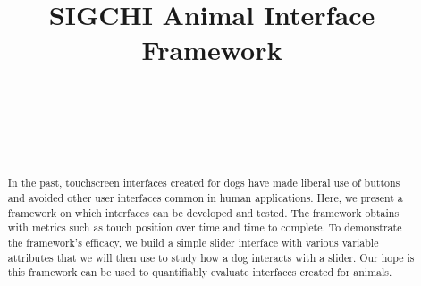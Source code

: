 \documentclass{sigchi}
\def\plaintitle{SIGCHI Animal Interface Framework}
\begin{document}
    \title{\plaintitle}

    \author{%
    \\
    \\
    \\
    \\
    }

    \maketitle

    \begin{abstract}
        In the past, touchscreen interfaces created for dogs have made liberal use of buttons and avoided other user interfaces common in human applications. Here, we present a framework on which interfaces can be developed and tested. The framework obtains with metrics such as touch position over time and time to complete. To demonstrate the framework’s efficacy, we build a simple slider interface with various variable attributes that we will then use to study how a dog interacts with a slider. Our hope is this framework can be used to quantifiably evaluate interfaces created for animals.
    \end{abstract}

     
\end{document}
